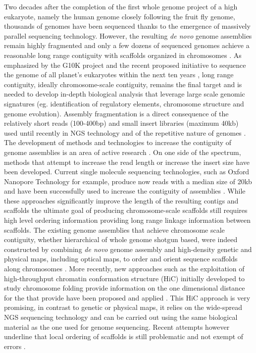 \documentclass[10pt,letterpaper]{article}
\begin{document}
Two decades after the completion of the first whole genome project of a high eukaryote, namely the human genome closely following the fruit fly genome, thousands of genomes have been sequenced \cite{Koepfli2015} thanks to the emergence of massively parallel sequencing technology. However, the resulting {\em de novo} genome assemblies remain highly fragmented \cite{Alkan2011} and only a few dozens of sequenced genomes achieve a reasonable long range contiguity with scaffolds organized in chromosomes \cite{Lewin2018}. As emphasized by the G10K project and the recent proposed initiative \cite{Lewin2018} to sequence the genome of all planet's eukaryotes within the next ten years \cite{Koepfli2015,Lewin2018}, long range contiguity, ideally chromosome-scale contiguity, remains the final target and is needed to develop in-depth biological analysis that leverage large scale genomic signatures (eg. identification of regulatory elements, chromosome structure and genome evolution). 
Assembly fragmentation is a direct consequence of the relatively short reads (100-400bp) and small insert libraries (maximum 40kb) used until recently in NGS technology and of the repetitive nature of genomes \cite{Li2012,Jiang2014b}. The development of methods and technologies to increase the contiguity of genome assemblies is an area of active research \cite{Dudchenko2017,Belser2018a,VanBuren2018a}. On one side of the spectrum, methods that attempt to increase the read length or increase the insert size have been developed. Current single molecule sequencing technologies, such as Oxford Nanopore Technology for example, produce now reads with a median size of 20kb \cite{Rhoads2015} and have been successfully used to increase the contiguity of assemblies \cite{Berlin2015}. 
While these approaches significantly improve the length of the resulting contigs and scaffolds the ultimate goal of producing chromosome-scale scaffolds still requires high level ordering information providing long range linkage information between scaffolds.
The existing genome assemblies that achieve chromosome scale contiguity, whether hierarchical of whole genome shotgun based, were indeed constructed by combining {\em de novo} genome assembly and high-density genetic and physical maps, including optical maps, to order and orient sequence scaffolds along chromosomes \cite{Lander2001,Chinwalla2002,Gibbs2004,Hillier2004,Jiang2014b,Groenen2012,Belser2018a}. 
More recently, new approaches such as the exploitation of high-throughput chromatin conformation structure (HiC) initially developed to study chromosome folding provide information on the one dimensional distance for the  that provide have been proposed and applied \cite{Dudchenko2017,VanBuren2018a}. This HiC approach is very promising, in contrast to genetic or physical maps, it relies on the wide-spread NGS sequencing technology and can be carried out using the same biological material as the one used for genome sequencing. Recent attempts however underline that local ordering of scaffolds is still problematic and not  exempt of errors \cite{Dudchenko2017}.
\end{document}
